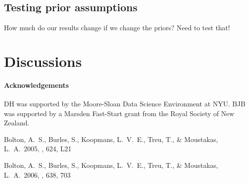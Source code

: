 \documentclass[12pt]{emulateapj}
\begin{document}
\subsection{Testing prior assumptions}

How much do our results change if we change the priors? Need to test that!

\section{Discussions}



\paragraph{Acknowledgements}
DH was supported by the Moore-Sloan Data Science Environment at NYU.
BJB was supported by a Marsden Fast-Start grant from the Royal Society of
New Zealand.



\begin{thebibliography}{999}

 Bolton, A.~S., Burles, 
S., Koopmans, L.~V.~E., Treu, T., 
\& Moustakas, L.~A.\ 2005, \apjl, 624, L21 

 Bolton, A.~S., Burles, 
S., Koopmans, L.~V.~E., Treu, T., \& Moustakas, L.~A.\ 2006, \apj, 638, 703 

\end{thebibliography}
\end{document}
